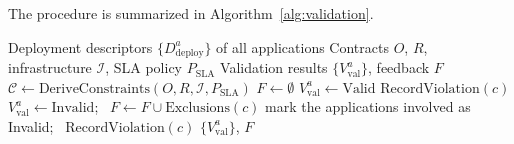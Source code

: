 The procedure is summarized in Algorithm~\ref{alg:validation}.

\begin{algorithm}[ht]
\caption{Deployment Plan Validation}
\label{alg:validation}
\begin{algorithmic}[1]
\Require Deployment descriptors $\{D_{\mathrm{deploy}}^a\}$ of all applications
\Require Contracts $O$, $R$, infrastructure $\mathcal{I}$, SLA policy $P_{\mathrm{SLA}}$
\Ensure Validation results $\{V_{\mathrm{val}}^a\}$, feedback $F$
\State $\mathcal{C} \leftarrow \mathrm{DeriveConstraints}(O, R, \mathcal{I}, P_{\mathrm{SLA}})$ 
\State $F \leftarrow \emptyset$
  \State $V_{\mathrm{val}}^a \leftarrow \mathrm{Valid}$
      \State $\mathrm{RecordViolation}(c)$
        \State $V_{\mathrm{val}}^a \leftarrow \mathrm{Invalid}$; \ $F \leftarrow F \cup \mathrm{Exclusions}(c)$
      \EndIf
    \EndIf
  \EndFor
\EndFor
{}
    \State mark the applications involved as Invalid; \ $\mathrm{RecordViolation}(c)$
  \EndIf
\EndFor
\State \Return $\{V_{\mathrm{val}}^a\}$, $F$ 
\end{algorithmic}
\end{algorithm}
